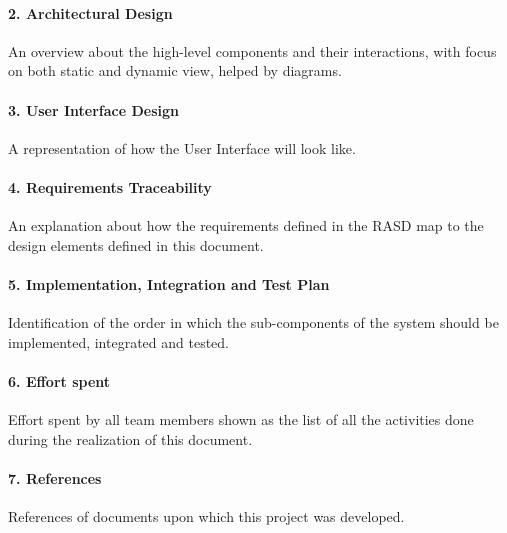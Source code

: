 \documentclass[../DD.tex]{subfiles}
\begin{document}
		\paragraph{2. Architectural Design}
		An overview about the high-level components	and	their interactions, with focus on both static and dynamic view, helped by diagrams.
		\paragraph{3. User Interface Design}
		A representation of how the User Interface will look like.
		\paragraph{4. Requirements Traceability}
		An explanation about how the requirements defined in the RASD map to the design elements defined in this document.
		\paragraph{5. Implementation, Integration and Test Plan}
		Identification of the order in which the sub-components of the system should be implemented, integrated and tested.
		\paragraph{6. Effort spent}
		Effort spent by all team members shown as the list of all the activities done during the realization of this document.
		\paragraph{7. References}
		References of documents upon which this project was developed.
		
		
		
\end{document}
